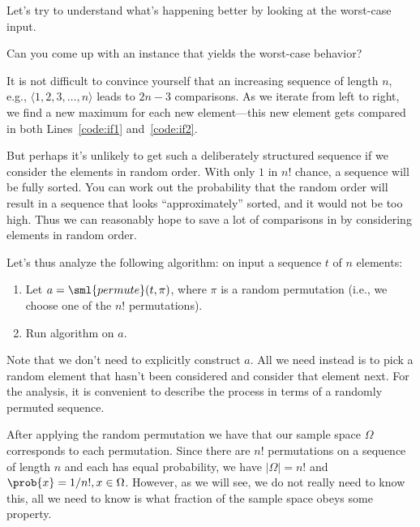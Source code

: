 {Let's try to understand what's happening better by looking at the
worst-case input. 
%
\begin{question}
 Can you come up with an instance that yields the
worst-case behavior?  
\end{question}
%
It is not difficult to convince yourself that an increasing sequence
of length $n$, e.g., $\langle 1, 2, 3, \dots, n\rangle$ leads to $2n
-3$ comparisons.
%
As we iterate from left to right, we find a new maximum for each new
element---this new element gets compared in both Lines~\ref{code:if1}
and~\ref{code:if2}.

But perhaps it's unlikely to get such a deliberately structured
sequence if we consider the elements in random order.  
%
With only $1$ in $n!$ chance, a sequence will be fully sorted.  
%
You
can work out the probability that the random order will result in a
sequence that looks ``approximately'' sorted, and it would not be too
high.  
%
Thus we can reasonably hope to save a lot of comparisons in
 by considering elements in random order.

Let's thus analyze the following algorithm:  on input a sequence $t$ of $n$
elements:
\begin{enumerate}
\item Let $a = \sml{permute}(t, \pi)$, where $\pi$ is a random permutation
  (i.e., we choose one of the $n!$ permutations).

\item Run algorithm  on $a$.
\end{enumerate}
%
Note that we don't need to explicitly construct $a$.
%
All we need instead is to pick a random element that hasn't been
considered and consider that element next.
%
For the analysis, it is convenient to describe the process
in terms of a randomly permuted sequence.


After applying the random permutation we have that our sample space
$\Omega$ corresponds to each permutation.   Since there are $n!$
permutations on a sequence of length $n$ and each has equal
probability, we have $|\Omega| = n!$ and $\prob{x} = 1/n!, x \in
\Omega$.   However, as we will see, we do not really need to know
this, all we need to know is what fraction of the sample space obeys
some property.

}
